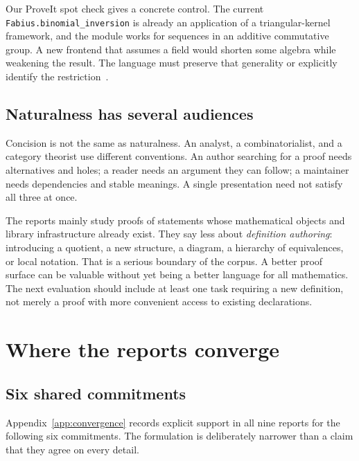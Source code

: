 \documentclass[11pt,letterpaper]{article}
\newcommand{\code}[1]{\nolinkurl{#1}}
\begin{document}
Our ProveIt spot check gives a concrete control. The current
\code{Fabius.binomial_inversion} is already an application of a triangular-kernel
framework, and the module works for sequences in an additive commutative group.
A new frontend that assumes a field would shorten some algebra while weakening
the result. The language must preserve that generality or explicitly identify the
restriction~\cite{p-binomial}.

\subsection{Naturalness has several audiences}
Concision is not the same as naturalness. An analyst, a combinatorialist, and a
category theorist use different conventions. An author searching for a proof
needs alternatives and holes; a reader needs an argument they can follow; a
maintainer needs dependencies and stable meanings. A single presentation need
not satisfy all three at once.

The reports mainly study proofs of statements whose mathematical objects and
library infrastructure already exist. They say less about \emph{definition authoring}:
introducing a quotient, a new structure, a diagram, a hierarchy of equivalences,
or local notation. That is a serious boundary of the corpus. A better proof
surface can be valuable without yet being a better language for all mathematics.
The next evaluation should include at least one task requiring a new definition,
not merely a proof with more convenient access to existing declarations.

\section{Where the reports converge}\label{sec:convergence}
\subsection{Six shared commitments}
Appendix~\ref{app:convergence} records explicit support in all nine reports for the
following six commitments. The formulation is deliberately narrower than a claim
that they agree on every detail.
\end{document}
